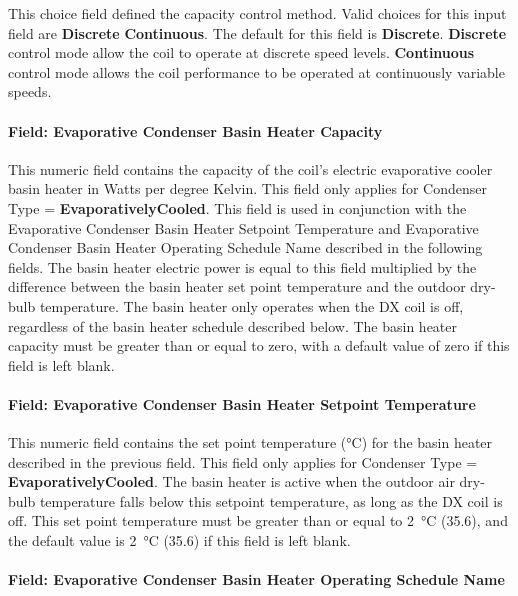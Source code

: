 This choice field defined the capacity control method. Valid choices for this input field are \textbf{Discrete} \textbf{Continuous}. The default for this field is \textbf{Discrete}. \textbf{Discrete} control mode allow the coil to operate at discrete speed levels. \textbf{Continuous} control mode allows the coil performance to be operated at continuously variable speeds.

\paragraph{Field: Evaporative Condenser Basin Heater Capacity}\label{field-evaporative-condenser-basin-heater-capacity-000}

This numeric field contains the capacity of the coil's electric evaporative cooler basin heater in Watts per degree Kelvin. This field only applies for Condenser Type = \textbf{EvaporativelyCooled}. This field is used in conjunction with the Evaporative Condenser Basin Heater Setpoint Temperature and Evaporative Condenser Basin Heater Operating Schedule Name described in the following fields. The basin heater electric power is equal to this field multiplied by the difference between the basin heater set point temperature and the outdoor dry-bulb temperature. The basin heater only operates when the DX coil is off, regardless of the basin heater schedule described below. The basin heater capacity must be greater than or equal to zero, with a default value of zero if this field is left blank.

\paragraph{Field: Evaporative Condenser Basin Heater Setpoint Temperature}\label{field-evaporative-condenser-basin-heater-setpoint-temperature-000}

This numeric field contains the set point temperature (\si{\celsius}) for the basin heater described in the previous field. This field only applies for Condenser Type = \textbf{EvaporativelyCooled}. The basin heater is active when the outdoor air dry-bulb temperature falls below this setpoint temperature, as long as the DX coil is off. This set point temperature must be greater than or equal to \SI{2}{\celsius} (\SI{35.6}{\fahrenheit}), and the default value is \SI{2}{\celsius} (\SI{35.6}{\fahrenheit}) if this field is left blank.

\paragraph{Field: Evaporative Condenser Basin Heater Operating Schedule Name}\label{field-evaporative-condenser-basin-heater-operating-schedule-name-000}

